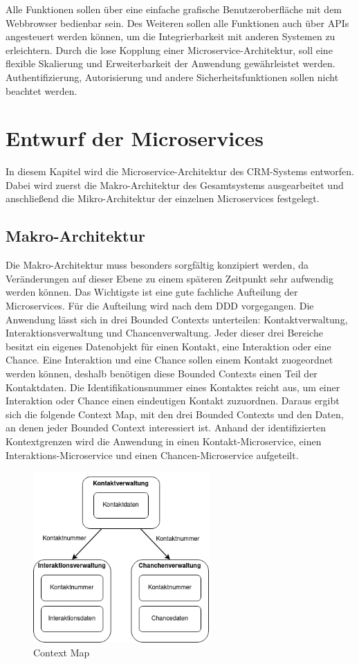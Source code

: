 Alle Funktionen sollen über eine einfache grafische Benutzeroberfläche mit dem Webbrowser bedienbar sein. Des Weiteren sollen alle Funktionen auch über \acp{API} angesteuert werden können, um die Integrierbarkeit mit anderen Systemen zu erleichtern. Durch die lose Kopplung einer Microservice-Architektur, soll eine flexible Skalierung und Erweiterbarkeit der Anwendung gewährleistet werden. Authentifizierung, Autorisierung und andere Sicherheitsfunktionen sollen nicht beachtet werden.

\clearpage
\section{Entwurf der Microservices}
In diesem Kapitel wird die Microservice-Architektur des \ac{CRM}-Systems entworfen. Dabei wird zuerst die Makro-Architektur des Gesamtsystems ausgearbeitet und anschließend die Mikro-Architektur der einzelnen Microservices festgelegt.

\subsection{Makro-Architektur}
Die Makro-Architektur muss besonders sorgfältig konzipiert werden, da Veränderungen auf dieser Ebene zu einem späteren Zeitpunkt sehr aufwendig werden können. Das Wichtigste ist eine gute fachliche Aufteilung der Microservices. Für die Aufteilung wird nach dem \ac{DDD} vorgegangen. Die Anwendung lässt sich in drei Bounded Contexts unterteilen: Kontaktverwaltung, Interaktionsverwaltung und Chancenverwaltung. Jeder dieser drei Bereiche besitzt ein eigenes Datenobjekt für einen Kontakt, eine Interaktion oder eine Chance. Eine Interaktion und eine Chance sollen einem Kontakt zuogeordnet werden können, deshalb benötigen diese Bounded Contexts einen Teil der Kontaktdaten. Die Identifikationsnummer eines Kontaktes reicht aus, um einer Interaktion oder Chance einen eindeutigen Kontakt zuzuordnen. Daraus ergibt sich die folgende Context Map, mit den drei Bounded Contexts und den Daten, an denen jeder Bounded Context interessiert ist. Anhand der identifizierten Kontextgrenzen wird die Anwendung in einen Kontakt-Microservice, einen Interaktions-Microservice und einen Chancen-Microservice aufgeteilt.

\begin{figure}[H] 
    \centering
    \includegraphics[width=0.60\textwidth]{figures/ContextMap.png}
    \caption{Context Map}
\end{figure}

